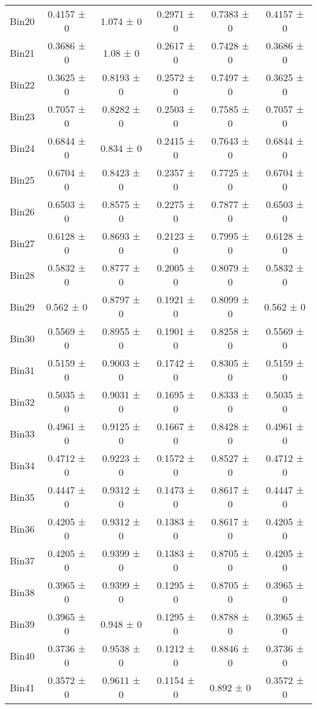 \begin{tabular}{@{\extracolsep{4pt}}lccccc@{}}
     Bin20 & 0.4157 ± 0 & 1.074 ± 0 & 0.2971 ± 0 & 0.7383 ± 0 & 0.4157 ± 0 \\ 
     Bin21 & 0.3686 ± 0 & 1.08 ± 0 & 0.2617 ± 0 & 0.7428 ± 0 & 0.3686 ± 0 \\ 
     Bin22 & 0.3625 ± 0 & 0.8193 ± 0 & 0.2572 ± 0 & 0.7497 ± 0 & 0.3625 ± 0 \\ 
     Bin23 & 0.7057 ± 0 & 0.8282 ± 0 & 0.2503 ± 0 & 0.7585 ± 0 & 0.7057 ± 0 \\ 
     Bin24 & 0.6844 ± 0 & 0.834 ± 0 & 0.2415 ± 0 & 0.7643 ± 0 & 0.6844 ± 0 \\ 
     Bin25 & 0.6704 ± 0 & 0.8423 ± 0 & 0.2357 ± 0 & 0.7725 ± 0 & 0.6704 ± 0 \\ 
     Bin26 & 0.6503 ± 0 & 0.8575 ± 0 & 0.2275 ± 0 & 0.7877 ± 0 & 0.6503 ± 0 \\ 
     Bin27 & 0.6128 ± 0 & 0.8693 ± 0 & 0.2123 ± 0 & 0.7995 ± 0 & 0.6128 ± 0 \\ 
     Bin28 & 0.5832 ± 0 & 0.8777 ± 0 & 0.2005 ± 0 & 0.8079 ± 0 & 0.5832 ± 0 \\ 
     Bin29 & 0.562 ± 0 & 0.8797 ± 0 & 0.1921 ± 0 & 0.8099 ± 0 & 0.562 ± 0 \\ 
     Bin30 & 0.5569 ± 0 & 0.8955 ± 0 & 0.1901 ± 0 & 0.8258 ± 0 & 0.5569 ± 0 \\ 
     Bin31 & 0.5159 ± 0 & 0.9003 ± 0 & 0.1742 ± 0 & 0.8305 ± 0 & 0.5159 ± 0 \\ 
     Bin32 & 0.5035 ± 0 & 0.9031 ± 0 & 0.1695 ± 0 & 0.8333 ± 0 & 0.5035 ± 0 \\ 
     Bin33 & 0.4961 ± 0 & 0.9125 ± 0 & 0.1667 ± 0 & 0.8428 ± 0 & 0.4961 ± 0 \\ 
     Bin34 & 0.4712 ± 0 & 0.9223 ± 0 & 0.1572 ± 0 & 0.8527 ± 0 & 0.4712 ± 0 \\ 
     Bin35 & 0.4447 ± 0 & 0.9312 ± 0 & 0.1473 ± 0 & 0.8617 ± 0 & 0.4447 ± 0 \\ 
     Bin36 & 0.4205 ± 0 & 0.9312 ± 0 & 0.1383 ± 0 & 0.8617 ± 0 & 0.4205 ± 0 \\ 
     Bin37 & 0.4205 ± 0 & 0.9399 ± 0 & 0.1383 ± 0 & 0.8705 ± 0 & 0.4205 ± 0 \\ 
     Bin38 & 0.3965 ± 0 & 0.9399 ± 0 & 0.1295 ± 0 & 0.8705 ± 0 & 0.3965 ± 0 \\ 
     Bin39 & 0.3965 ± 0 & 0.948 ± 0 & 0.1295 ± 0 & 0.8788 ± 0 & 0.3965 ± 0 \\ 
     Bin40 & 0.3736 ± 0 & 0.9538 ± 0 & 0.1212 ± 0 & 0.8846 ± 0 & 0.3736 ± 0 \\ 
     Bin41 & 0.3572 ± 0 & 0.9611 ± 0 & 0.1154 ± 0 & 0.892 ± 0 & 0.3572 ± 0 \\ 

\end{tabular}
